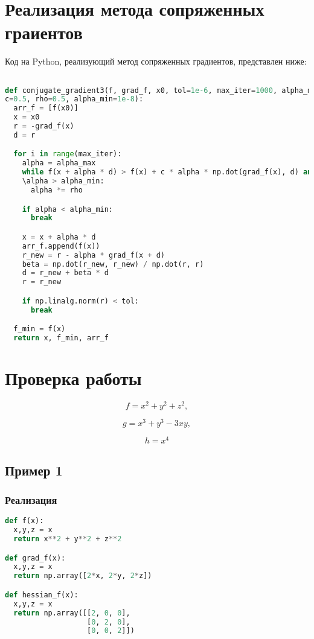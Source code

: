 \documentclass{article}
\begin{document}
\newpage
\section{Реализация метода сопряженных граиентов}
Код на Python, реализующий метод сопряженных градиентов, представлен ниже:

\begin{lstlisting}[language=Python]

def conjugate_gradient3(f, grad_f, x0, tol=1e-6, max_iter=1000, alpha_max=1.0,
c=0.5, rho=0.5, alpha_min=1e-8):
  arr_f = [f(x0)]
  x = x0
  r = -grad_f(x)
  d = r

  for i in range(max_iter):
    alpha = alpha_max
    while f(x + alpha * d) > f(x) + c * alpha * np.dot(grad_f(x), d) and
    \alpha > alpha_min:
      alpha *= rho

    if alpha < alpha_min:
      break

    x = x + alpha * d
    arr_f.append(f(x))
    r_new = r - alpha * grad_f(x + d)
    beta = np.dot(r_new, r_new) / np.dot(r, r)
    d = r_new + beta * d
    r = r_new

    if np.linalg.norm(r) < tol:
      break

  f_min = f(x)
  return x, f_min, arr_f

\end{lstlisting}

\newpage
\section{Проверка работы}

$$f = x^2 + y^2 + z^2,$$

$$g = x^3 + y^3 - 3xy,$$

$$h = x^4$$

\subsection{Пример 1}

\subsubsection{Реализация}
\begin{lstlisting}[language=Python]
def f(x):
  x,y,z = x
  return x**2 + y**2 + z**2

def grad_f(x):
  x,y,z = x
  return np.array([2*x, 2*y, 2*z])

def hessian_f(x):
  x,y,z = x
  return np.array([[2, 0, 0],
                   [0, 2, 0],
                   [0, 0, 2]])
\end{lstlisting}
\end{document}
